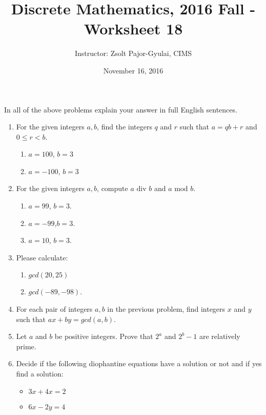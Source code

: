 \documentclass[11pt]{preprint}
\title{Discrete Mathematics, 2016 Fall - Worksheet 18}
\author{Instructor: Zsolt Pajor-Gyulai, CIMS}
\date{November 16, 2016}
\def\enumb{\begin{enumerate}}
\def\enume{\end{enumerate}}
\def\itemb{\begin{itemize}}
\def\iteme{\end{itemize}}
\begin{document}
\maketitle

In all of the above problems explain your answer in full English sentences.

\enumb
\item For the given integers $a,b$, find the integers $q$ and $r$ such that $a=qb+r$ and $0\leq r<b$.
\enumb
\item $a=100$, $b=3$
\item $a=-100$, $b=3$
\enume
\item For the given integers $a,b$, compute $a\textrm{ div } b$ and $a\textrm{ mod } b$.
\enumb
\item $a=99$, $b=3$.
\item $a=-99$,$b=3$.
\item $a=10$, $b=3$.
\enume

\item Please calculate:
\enumb
\item $gcd(20,25)$
\item $gcd(-89,-98)$.
\enume
\item For each pair of integers $a,b$ in the previous problem, find integers $x$ and $y$ such that $ax+by=gcd(a,b)$.
\item Let $a$ and $b$ be positive integers. Prove that $2^a$ and $2^b-1$ are relatively prime.
\item Decide if the following diophantine equations have a solution or not and if yes find a solution:
\itemb
\item $3x+4x=2$
\item $6x-2y=4$
\iteme
\enume
\end{document}
